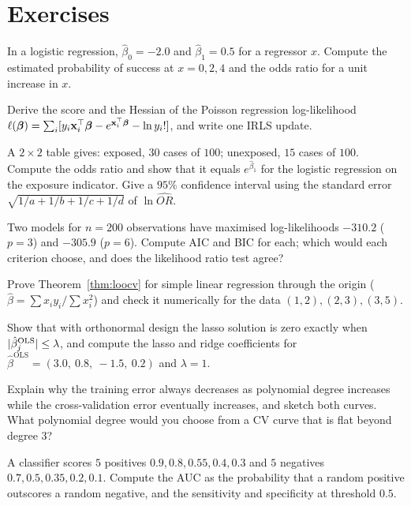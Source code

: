\section{Exercises}

\begin{exercise}
In a logistic regression, $\hat\beta_0=-2.0$ and $\hat\beta_1=0.5$ for a regressor $x$. Compute the estimated probability of success at $x=0,2,4$ and the odds ratio for a unit increase in $x$.
\end{exercise}

\begin{exercise}
Derive the score and the Hessian of the Poisson regression log-likelihood $\ell(\boldsymbol\beta)=\sum_i[y_i\mathbf{x}_i^{\top}\boldsymbol\beta-e^{\mathbf{x}_i^{\top}\boldsymbol\beta}-\ln y_i!]$, and write one IRLS update.
\end{exercise}

\begin{exercise}
A $2\times2$ table gives: exposed, $30$ cases of $100$; unexposed, $15$ cases of $100$. Compute the odds ratio and show that it equals $e^{\hat\beta_1}$ for the logistic regression on the exposure indicator. Give a $95\%$ confidence interval using the standard error $\sqrt{1/a+1/b+1/c+1/d}$ of $\ln\widehat{OR}$.
\end{exercise}

\begin{exercise}
Two models for $n=200$ observations have maximised log-likelihoods $-310.2$ ($p=3$) and $-305.9$ ($p=6$). Compute AIC and BIC for each; which would each criterion choose, and does the likelihood ratio test agree?
\end{exercise}

\begin{exercise}
Prove Theorem~\ref{thm:loocv} for simple linear regression through the origin ($\hat\beta=\sum x_iy_i/\sum x_i^2$) and check it numerically for the data $(1,2),(2,3),(3,5)$.
\end{exercise}

\begin{exercise}
Show that with orthonormal design the lasso solution is zero exactly when $\lvert\hat\beta_j^{\mathrm{OLS}}\rvert\le\lambda$, and compute the lasso and ridge coefficients for $\hat\beta^{\mathrm{OLS}}=(3.0,\ 0.8,\ -1.5,\ 0.2)$ and $\lambda=1$.
\end{exercise}

\begin{exercise}
Explain why the training error always decreases as polynomial degree increases while the cross-validation error eventually increases, and sketch both curves. What polynomial degree would you choose from a CV curve that is flat beyond degree $3$?
\end{exercise}

\begin{exercise}
A classifier scores $5$ positives $0.9,0.8,0.55,0.4,0.3$ and $5$ negatives $0.7,0.5,0.35,0.2,0.1$. Compute the AUC as the probability that a random positive outscores a random negative, and the sensitivity and specificity at threshold $0.5$.
\end{exercise}
